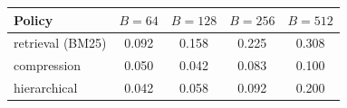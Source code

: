\begin{tabular}{lcccc}
\toprule
Policy & $B{=}64$ & $B{=}128$ & $B{=}256$ & $B{=}512$ \\
\midrule
retrieval (BM25) & 0.092 & 0.158 & 0.225 & 0.308\\
compression & 0.050 & 0.042 & 0.083 & 0.100\\
hierarchical & 0.042 & 0.058 & 0.092 & 0.200\\
\bottomrule
\end{tabular}